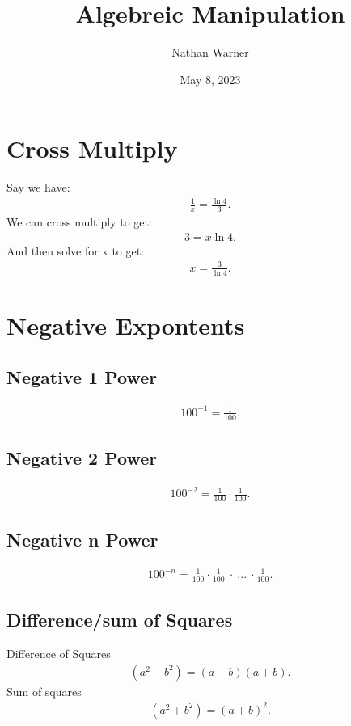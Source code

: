 \documentclass{report}
\title{\Huge{Algebreic Manipulation}}
\author{\huge{Nathan Warner}}
\date{\huge{May 8, 2023}}
\begin{document}
    \maketitle
    \tableofcontents
    \pagebreak \bigbreak \noindent
    \section{\Large{Cross Multiply}}
    \bigbreak \noindent \bigbreak \noindent
    Say we have:
    \begin{align*}
        \frac{1}{x} = \frac{\ln{4}}{3}
    .\end{align*}
    \bigbreak \noindent 
    We can cross multiply to get:
    \begin{align*}
        3=x\ln{4}
    .\end{align*}
    \bigbreak \noindent 
    And then solve for x to get:
    \begin{align*}
        x = \frac{3}{\ln{4}}
    .\end{align*}

    \section{Negative Expontents} 
    \subsection{Negative 1 Power}
    \begin{align*}
        100^{-1} =  \frac{1}{100}
    .\end{align*}
    \subsection{Negative 2 Power}
    \begin{align*}
        100^{-2} = \frac{1}{100} \cdot \frac{1}{100}
    .\end{align*}
    \subsection{Negative n Power}
    \begin{align*}
        100^{-n} = \frac{1}{100} \cdot \frac{1}{100}\ \cdot\  ...\ \cdot  \frac{1}{100}
    .\end{align*}

    \bigbreak \noindent \bigbreak \noindent
    \subsection{Difference/sum of Squares}
    Difference of Squares
    \begin{align*}
        (a^{2} - b^{2}) 
        = (a-b)(a+b)
    .\end{align*}
    \bigbreak \noindent 
    Sum of squares
    \begin{align*}
        (a^{2}+b^{2}) 
        =(a+b)^{2}
    .\end{align*}
\end{document}
